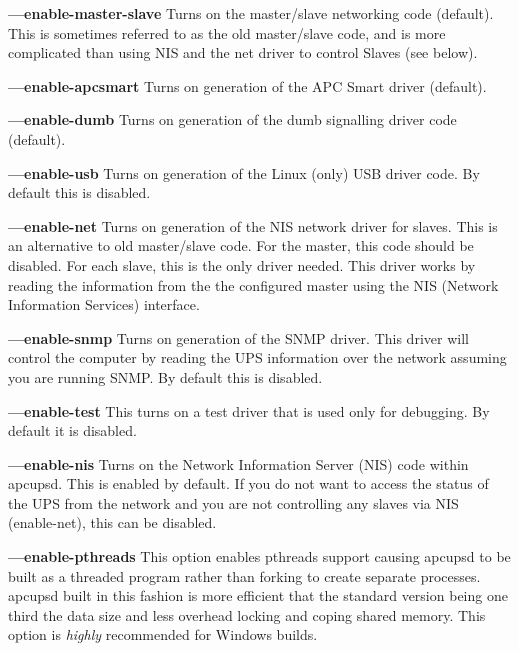 \begin{description}
\item {\bf {---}enable-master-slave}
Turns on the master/slave networking code (default). This is sometimes
referred to as the old master/slave code, and is more complicated than using
NIS and the net driver to control Slaves (see below).  

\item {\bf {---}enable-apcsmart}
Turns on generation of the APC Smart driver (default).  

\item {\bf {---}enable-dumb}
Turns on generation of the dumb signalling driver code (default).  

\item {\bf {---}enable-usb}
Turns on generation of the Linux (only) USB driver code. By default this is
disabled.  

\item {\bf {---}enable-net}
Turns on generation of the NIS network driver for slaves. This is an
alternative to old master/slave code. For the master, this code should be
disabled. For each slave, this is the only driver needed. This driver works by
reading the information from the the configured master using the NIS (Network
Information Services) interface.  

\item {\bf {---}enable-snmp}
Turns on generation of the SNMP driver. This driver will control the computer
by reading the UPS information over the network assuming you are running SNMP.
By default this is disabled.  

\item {\bf {---}enable-test}
This turns on a test driver that is used only for debugging. By default it is
disabled.  

\item {\bf {---}enable-nis}
Turns on the Network Information Server (NIS) code within apcupsd. This is
enabled by default. If you do not want to access the status of the UPS from
the network and you are not controlling any slaves via NIS (enable-net), this
can be disabled.  

\item {\bf {---}enable-pthreads}
This option enables pthreads support causing apcupsd to be built as a threaded
program rather than forking to create separate processes. apcupsd built in
this fashion is more efficient that the standard version being one third the
data size and less overhead locking and coping shared memory. This option is
{\it highly} recommended for Windows builds.  


\end{description}
